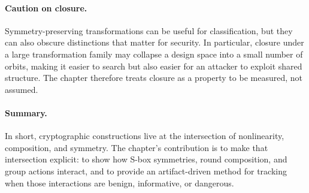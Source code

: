 \documentclass[11pt]{article}
\begin{document}
\paragraph{Caution on closure.} Symmetry-preserving transformations can be useful for classification, but they can also obscure distinctions that matter for security. In particular, closure under a large transformation family may collapse a design space into a small number of orbits, making it easier to search but also easier for an attacker to exploit shared structure. The chapter therefore treats closure as a property to be measured, not assumed.

\paragraph{Summary.} In short, cryptographic constructions live at the intersection of nonlinearity, composition, and symmetry. The chapter's contribution is to make that intersection explicit: to show how S-box symmetries, round composition, and group actions interact, and to provide an artifact-driven method for tracking when those interactions are benign, informative, or dangerous.
\end{document}
